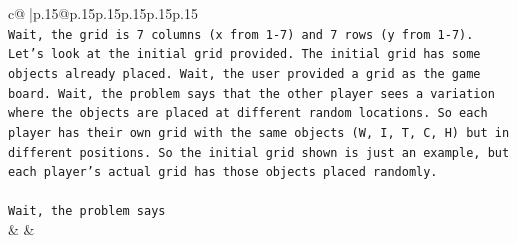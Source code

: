 \documentclass{article}
\begin{document}
{\begin{supertabular}{c@{$\;$}|p{.15\linewidth}@{}p{.15\linewidth}p{.15\linewidth}p{.15\linewidth}p{.15\linewidth}p{.15\linewidth}}
{{{\\ 
\texttt{Wait, the grid is 7 columns (x from 1{-}7) and 7 rows (y from 1{-}7). Let's look at the initial grid provided. The initial grid has some objects already placed. Wait, the user provided a grid as the game board. Wait, the problem says that the other player sees a variation where the objects are placed at different random locations. So each player has their own grid with the same objects (W, I, T, C, H) but in different positions. So the initial grid shown is just an example, but each player's actual grid has those objects placed randomly.} \\
\\ 
\texttt{Wait, the problem says} \\
            }
        }
    }
    & & \\ \\


\end{supertabular}}
\end{document}
